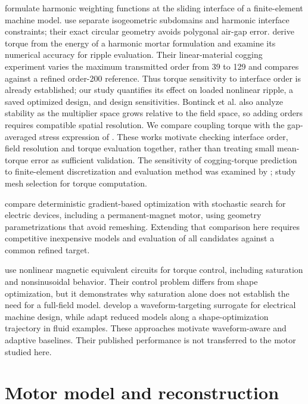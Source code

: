 \documentclass{anvil-paper}
\begin{document}
\citet{degersem2004harmonic} formulate harmonic weighting functions at
the sliding interface of a finite-element machine model.
\citet{bontinck2018isogeometric} use separate isogeometric subdomains and
harmonic interface constraints; their exact circular geometry avoids
polygonal air-gap error. \citet{egger2022torque} derive torque from the
energy of a harmonic mortar formulation and examine its numerical
accuracy for ripple evaluation. Their linear-material cogging experiment
varies the maximum transmitted order from 39 to 129 and compares against
a refined order-200 reference. Thus torque sensitivity to interface order
is already established; our study quantifies its effect on loaded nonlinear
ripple, a saved optimized design, and design sensitivities.
Bontinck et al. also analyze stability as the multiplier space grows
relative to the field space, so adding orders requires compatible spatial
resolution. We compare coupling torque with the
gap-averaged stress expression of \citet{arkkio1987}. These works motivate
checking interface order, field resolution and torque evaluation together,
rather than treating small mean-torque error as sufficient validation.
The sensitivity of cogging-torque prediction to finite-element
discretization and evaluation method was examined by \citet{howe1992cogging};
\citet{arkkio2012proper} study mesh selection for torque computation.

\citet{ion2018robust} compare deterministic gradient-based optimization
with stochastic search for electric devices, including a permanent-magnet
motor, using geometry parametrizations that avoid remeshing. Extending
that comparison here requires competitive inexpensive models and evaluation
of all candidates against a common refined target.

\citet{kemmetmueller2015} use nonlinear magnetic equivalent circuits for
torque control, including saturation and nonsinusoidal behavior. Their
control problem differs from shape optimization, but it demonstrates why
saturation alone does not establish the need for a full-field model.
\citet{roomi2022} develop a waveform-targeting surrogate for electrical
machine design, while \citet{wen2023} adapt reduced models along a
shape-optimization trajectory in fluid examples. These approaches motivate
waveform-aware and adaptive baselines. Their published performance is not
transferred to the motor studied here.

\section{Motor model and reconstruction}
\end{document}
